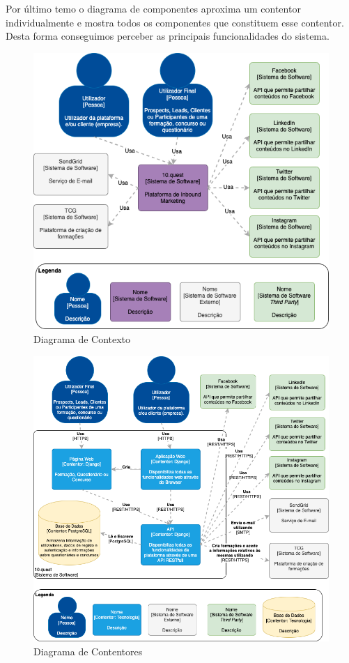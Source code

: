Por último temo o diagrama de componentes aproxima um contentor individualmente e mostra todos os componentes que constituem esse contentor. Desta forma conseguimos perceber as principais funcionalidades do sistema. 

\begin{figure}[ht!]
	\begin{center}
		\includegraphics[width=1\textwidth]{img/arq/diagrama-contexto}
		\caption{Diagrama de Contexto}
		\label{fig:arq-contexto}
	\end{center}
\end{figure}

\begin{figure}[ht!]
	\begin{center}
		\includegraphics[width=1\textwidth]{img/arq/diagrama-contentores}
		\caption{Diagrama de Contentores}
		\label{fig:arq-contentores}
	\end{center}
\end{figure}

